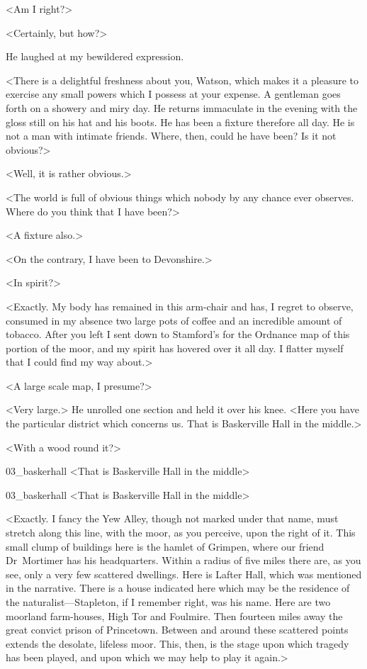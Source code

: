 <Am I right?>

<Certainly, but how?>

He laughed at my bewildered expression.

<There is a delightful freshness about you, Watson, which makes it a pleasure to exercise any small powers which I possess at your expense. A gentleman goes forth on a showery and miry day. He returns immaculate in the evening with the gloss still on his hat and his boots. He has been a fixture therefore all day. He is not a man with intimate friends. Where, then, could he have been? Is it not obvious?>

<Well, it is rather obvious.>

<The world is full of obvious things which nobody by any chance ever observes. Where do you think that I have been?>

<A fixture also.>

<On the contrary, I have been to Devonshire.>

<In spirit?>

<Exactly. My body has remained in this arm-chair and has, I regret to observe, consumed in my absence two large pots of coffee and an incredible amount of tobacco. After you left I sent down to Stamford's for the Ordnance map of this portion of the moor, and my spirit has hovered over it all day. I flatter myself that I could find my way about.>

<A large scale map, I presume?>

<Very large.> He unrolled one section and held it over his knee. <Here you have the particular district which concerns us. That is Baskerville Hall in the middle.>

<With a wood round it?>

\begin{letter}
	\begin{bwbigpic}
		[1.0] 
		{03_baskerhall}
		{<That is Baskerville Hall in the middle>}
	\end{bwbigpic}
\end{letter}
\begin{a4}
	\begin{bwbigpic}
		[0.9] 
		{03_baskerhall}
		{<That is Baskerville Hall in the middle>}
	\end{bwbigpic}
\end{a4}

<Exactly. I fancy the Yew Alley, though not marked under that name, must stretch along this line, with the moor, as you perceive, upon the right of it. This small clump of buildings here is the hamlet of Grimpen, where our friend Dr~Mortimer has his headquarters. Within a radius of five miles there are, as you see, only a very few scattered dwellings. Here is Lafter Hall, which was mentioned in the narrative. There is a house indicated here which may be the residence of the naturalist—Stapleton, if I remember right, was his name. Here are two moorland farm-houses, High Tor and Foulmire. Then fourteen miles away the great convict prison of Princetown. Between and around these scattered points extends the desolate, lifeless moor. This, then, is the stage upon which tragedy has been played, and upon which we may help to play it again.>

